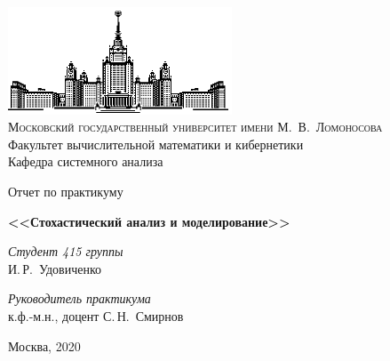 \documentclass{subfiles}
\begin{document}
\thispagestyle{empty}

\begin{center}
\ \vspace{-3cm}

\includegraphics[width=0.5\textwidth]{msu.eps}\\
{\scshape Московский государственный университет имени М.~В.~Ломоносова}\\
Факультет вычислительной математики и кибернетики\\
Кафедра системного анализа

\vfill

{\LARGE Отчет по практикуму}

\vspace{1cm}

{\Huge\bfseries <<Стохастический анализ и моделирование>>}
\end{center}

\vspace{1cm}

\begin{flushright}
  \large
  \textit{Студент 415 группы}\\
  И.\,Р.~Удовиченко

  \vspace{5mm}

  \textit{Руководитель практикума}\\
  к.ф.-м.н., доцент С.\,Н.~Смирнов
\end{flushright}

\vfill

\begin{center}
Москва, 2020
\end{center}

\newpage
\end{document}
